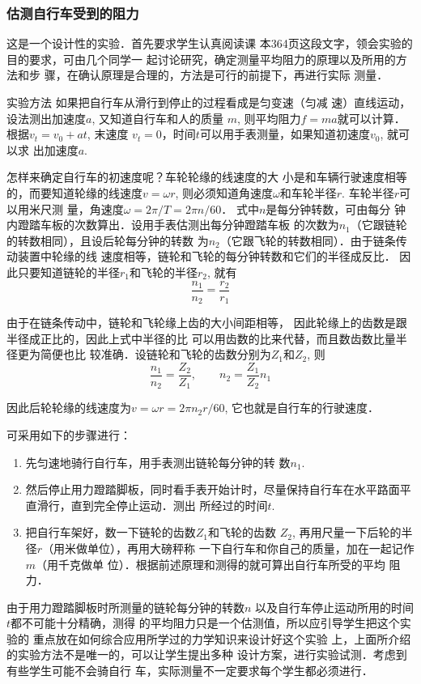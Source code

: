 \subsubsection{估测自行车受到的阻力}
这是一个设计性的实验．首先要求学生认真阅读课
本364页这段文字，领会实验的目的要求，可由几个同学一
起讨论研究，确定测量平均阻力的原理以及所用的方法和步
骤，在确认原理是合理的，方法是可行的前提下，再进行实际
测量．

实验方法
如果把自行车从滑行到停止的过程看成是匀变速（匀减
速）直线运动，设法测出加速度$a$, 又知道自行车和人的质量
$m$, 则平均阻力$f=ma$就可以计算．根据$v_t=v_0+at$, 末速度
$v_t=0$，时间$t$可以用手表测量，如果知道初速度$v_0$, 就可以求
出加速度$a$.

怎样来确定自行车的初速度呢？车轮轮缘的线速度的大
小是和车辆行驶速度相等的，而要知道轮缘的线速度$v=\omega r$,
则必须知道角速度$\omega$和车轮半径$r$. 车轮半径$r$可以用米尺测
量，角速度$ω=2\pi/T=2\pi n/60$．
式中$n$是每分钟转数，可由每分
钟内蹬踏车板的次数算出．设用手表估测出每分钟蹬踏车板
的次数为$n_1$（它跟链轮的转数相同），且设后轮每分钟的转数
为$n_2$（它跟飞轮的转数相同）．由于链条传动装置中轮缘的线
速度相等，链轮和飞轮的每分钟转数和它们的半径成反比．
因此只要知道链轮的半径$r_1$和飞轮的半径$r_2$, 就有
\[\frac{n_1}{n_2}=\frac{r_2}{r_1}\]

由于在链条传动中，链轮和飞轮缘上齿的大小间距相等，
因此轮缘上的齿数是跟半径成正比的，因此上式中半径的比
可以用齿数的比来代替，而且数齿数比量半径更为简便也比
较准确．设链轮和飞轮的齿数分别为$Z_1$和$Z_2$, 则
\[\frac{n_1}{n_2}=\frac{Z_2}{Z_1},\qquad n_2=\frac{Z_1}{Z_2}n_1\]

因此后轮轮缘的线速度为$v=\omega r=2\pi n_2r/60$, 
它也就是自行车的行驶速度．

可采用如下的步骤进行：
\begin{enumerate}
    \item 先匀速地骑行自行车，用手表测出链轮每分钟的转
数$n_1$.
\item 然后停止用力蹬踏脚板，同时看手表开始计时，尽量保持自行车在水平路面平直滑行，直到完全停止运动．测出
所经过的时间$t$.
\item 把自行车架好，数一下链轮的齿数$Z_1$和飞轮的齿数
$Z_2$, 再用尺量一下后轮的半径$r$（用米做单位），再用大磅秤称
一下自行车和你自己的质量，加在一起记作$m$（用千克做单
位）．根据前述原理和测得的就可算出自行车所受的平均
阻力．
\end{enumerate}

由于用力蹬踏脚板时所测量的链轮每分钟的转数$n$
以及自行车停止运动所用的时间$t$都不可能十分精确，测得
的平均阻力只是一个估测值，所以应引导学生把这个实验的
重点放在如何综合应用所学过的力学知识来设计好这个实验
上，上面所介绍的实验方法不是唯一的，可以让学生提出多种
设计方案，进行实验试测．考虑到有些学生可能不会骑自行
车，实际测量不一定要求每个学生都必须进行．

